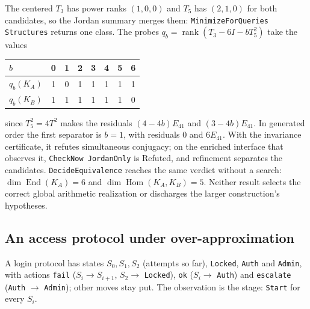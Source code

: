 \documentclass[11pt]{article}
\newcommand{\code}[1]{\texttt{#1}}
\newcommand{\Hom}{\operatorname{Hom}}
\newcommand{\End}{\operatorname{End}}
\newcommand{\rank}{\operatorname{rank}}
\theoremstyle{definition}
\theoremstyle{plain}
\begin{document}
The centered $T_3$ has power ranks $(1,0,0)$ and $T_5$ has $(2,1,0)$ for both candidates, so the
Jordan summary merges them: \code{MinimizeForQueries Structures} returns one class. The probes
$q_b=\rank(T_3-6I-bT_5^2)$ take the values
\begin{center}\small
\begin{tabular}{lccccccc}
\toprule
$b$ & 0 & 1 & 2 & 3 & 4 & 5 & 6\\
\midrule
$q_b(K_A)$ & 1 & 0 & 1 & 1 & 1 & 1 & 1\\
$q_b(K_B)$ & 1 & 1 & 1 & 1 & 1 & 1 & 0\\
\bottomrule
\end{tabular}
\end{center}
since $T_5^2=4T^2$ makes the residuals $(4-4b)E_{41}$ and $(3-4b)E_{41}$. In generated order the
first separator is $b=1$, with residuals $0$ and $6E_{41}$. With the invariance certificate, it
refutes simultaneous conjugacy; on the enriched interface that observes it, \code{CheckNow
JordanOnly} is Refuted, and refinement separates the candidates. \code{DecideEquivalence} reaches
the same verdict without a search: $\dim\End(K_A)=6$ and $\dim\Hom(K_A,K_B)=5$. Neither result
selects the correct global arithmetic realization or discharges the larger construction's
hypotheses.

\subsection{An access protocol under over-approximation}\label{sec:lockout}

A login protocol has states $S_0,S_1,S_2$ (attempts so far), \code{Locked}, \code{Auth} and
\code{Admin}, with actions \code{fail} ($S_i\to S_{i+1}$, $S_2\to$ \code{Locked}), \code{ok}
($S_i\to$ \code{Auth}) and \code{escalate} (\code{Auth} $\to$ \code{Admin}); other moves stay put.
The observation is the stage: \code{Start} for every $S_i$.
\end{document}
